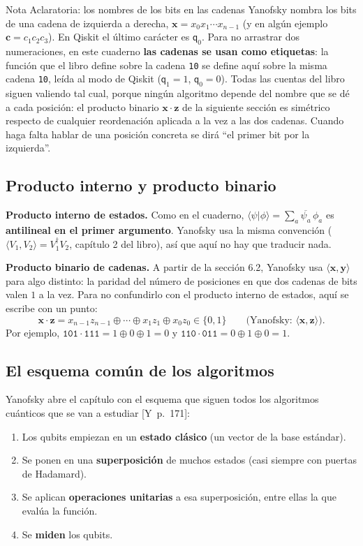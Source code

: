 \documentclass[11pt, a4paper, twoside, openright]{report}
\providecommand{\braket}[2]{\langle #1|#2\rangle}
\newcommand{\bx}{\mathbf{x}}
\newcommand{\by}{\mathbf{y}}
\newcommand{\bz}{\mathbf{z}}
\newcommand{\bc}{\mathbf{c}}
\newcommand{\Yan}[1]{\textcolor{rosaviejo}{\small[Y~#1]}}  %
\begin{document}
\begin{aclaracion}{Nota Aclaratoria: los nombres de los bits en las cadenas}
Yanofsky nombra los bits de una cadena de izquierda a derecha, $\bx = x_0x_1\cdots x_{n-1}$ (y en algún ejemplo $\bc = c_1c_2c_3$). En Qiskit el último carácter es $\mathsf{q}_0$. Para no arrastrar dos numeraciones, en este cuaderno \textbf{las cadenas se usan como etiquetas}: la función que el libro define sobre la cadena \texttt{10} se define aquí sobre la misma cadena \texttt{10}, leída al modo de Qiskit ($\mathsf{q}_1 = 1$, $\mathsf{q}_0 = 0$). Todas las cuentas del libro siguen valiendo tal cual, porque ningún algoritmo depende del nombre que se dé a cada posición: el producto binario $\bx\cdot\bz$ de la siguiente sección es simétrico respecto de cualquier reordenación aplicada a la vez a las dos cadenas. Cuando haga falta hablar de una posición concreta se dirá ``el primer bit por la izquierda''.
\end{aclaracion}

\subsection*{Producto interno y producto binario}

\noindent \textbf{Producto interno de estados.} Como en el cuaderno, $\braket{\psi}{\phi} = \sum_a \overline{\psi_a}\,\phi_a$ es \textbf{antilineal en el primer argumento}. Yanofsky usa la misma convención ($\langle V_1, V_2\rangle = V_1^\dagger V_2$, capítulo 2 del libro), así que aquí no hay que traducir nada.

\noindent \textbf{Producto binario de cadenas.} A partir de la sección 6.2, Yanofsky usa $\langle \bx,\by\rangle$ para algo distinto: la paridad del número de posiciones en que dos cadenas de bits valen $1$ a la vez. Para no confundirlo con el producto interno de estados, aquí se escribe con un punto:
\[ \bx\cdot\bz = x_{n-1}z_{n-1}\oplus\cdots\oplus x_1z_1\oplus x_0z_0 \in\{0,1\} \qquad \text{(Yanofsky: } \langle\bx,\bz\rangle\text{)}. \]
Por ejemplo, $\texttt{101}\cdot\texttt{111} = 1\oplus0\oplus1 = 0$ y $\texttt{110}\cdot\texttt{011} = 0\oplus1\oplus0 = 1$.

\subsection*{El esquema común de los algoritmos}

\noindent Yanofsky abre el capítulo con el esquema que siguen todos los algoritmos cuánticos que se van a estudiar \Yan{p.~171}:
\begin{enumerate}
    \item Los qubits empiezan en un \textbf{estado clásico} (un vector de la base estándar).
    \item Se ponen en una \textbf{superposición} de muchos estados (casi siempre con puertas de Hadamard).
    \item Se aplican \textbf{operaciones unitarias} a esa superposición, entre ellas la que evalúa la función.
    \item Se \textbf{miden} los qubits.
\end{enumerate}
\end{document}
